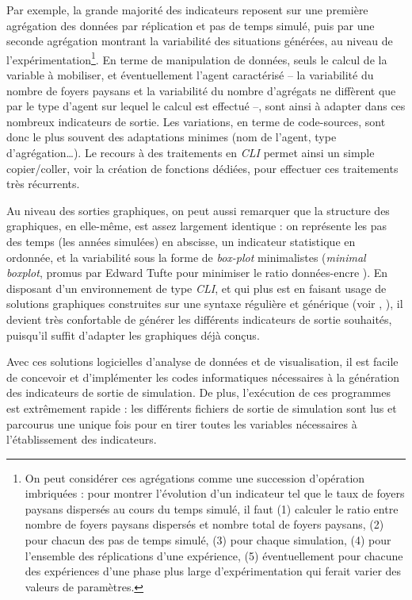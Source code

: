 	Par exemple, la grande majorité des indicateurs reposent sur une première agrégation des données par réplication et pas de temps simulé, puis par une seconde agrégation montrant la variabilité des situations générées, au niveau de l'expérimentation\footnote{
	On peut considérer ces agrégations comme une succession d'opération imbriquées : pour montrer l'évolution d'un indicateur tel que le taux de foyers paysans dispersés au cours du temps simulé, il faut (1) calculer le ratio entre nombre de foyers paysans dispersés et nombre total de foyers paysans, (2) pour chacun des pas de temps simulé, (3) pour chaque simulation, (4) pour l'ensemble des réplications d'une expérience, (5) éventuellement pour chacune des expériences d'une phase plus large d'expérimentation qui ferait varier des valeurs de paramètres.
	}.
	En terme de manipulation de données, seuls le calcul de la variable à mobiliser, et éventuellement l'agent caractérisé -- la variabilité du nombre de foyers paysans et la variabilité du nombre d'agrégats ne diffèrent que par le type d'agent sur lequel le calcul est effectué --, sont ainsi à adapter dans ces nombreux indicateurs de sortie.
	Les variations, en terme de code-sources, sont donc le plus souvent des adaptations minimes (nom de l'agent, type d'agrégation\ldots).
	Le recours à des traitements en \textit{CLI} permet ainsi un simple copier/coller, voir la création de fonctions dédiées, pour effectuer ces traitements très récurrents.

	Au niveau des sorties graphiques, on peut aussi remarquer que la structure des graphiques, en elle-même, est assez largement identique : on représente les pas des temps (les années simulées) en abscisse, un indicateur statistique en ordonnée, et la variabilité sous la forme de \textit{box-plot} minimalistes (\og \textit{minimal boxplot}\fg{}, promus par Edward Tufte pour minimiser le ratio données-encre \autocite[123-125]{tufte_visual_2001}).
	En disposant d'un environnement de type \textit{CLI}, et qui plus est en faisant usage de solutions graphiques construites sur une syntaxe régulière et générique (voir , ), il devient très confortable de générer les différents indicateurs de sortie souhaités, puisqu'il suffit d'adapter les graphiques déjà conçus.

	Avec ces solutions logicielles d'analyse de données et de visualisation, il est facile de concevoir et d'implémenter les codes informatiques nécessaires à la génération des indicateurs de sortie de simulation.
	De plus, l'exécution de ces programmes est extrêmement rapide :  les différents fichiers de sortie de simulation sont lus et parcourus une unique fois pour en tirer toutes les variables nécessaires à l'établissement des indicateurs.

